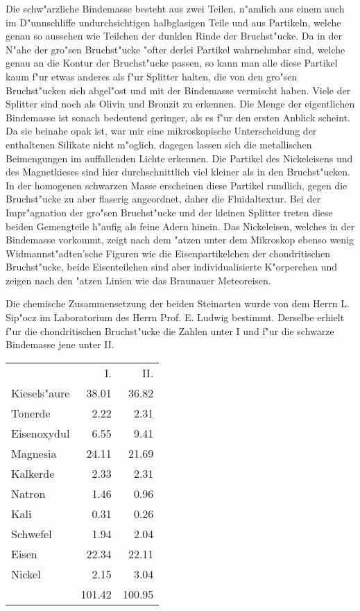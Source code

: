 \documentclass[a4paper, 11pt, oneside]{article}
\begin{document}
Die schw"arzliche Bindemasse besteht aus zwei Teilen, n"amlich aus einem auch im D"unnschliffe undurchsichtigen halbglasigen Teile und aus Partikeln, welche genau so aussehen wie Teilchen der dunklen Rinde der Bruchst"ucke. Da in der N"ahe der gro"sen Bruchst"ucke "ofter derlei Partikel wahrnehmbar sind, welche genau an die Kontur der Bruchst"ucke passen, so kann man alle diese Partikel kaum f"ur etwas anderes als f"ur Splitter halten, die von den gro"sen Bruchst"ucken sich abgel"ost und mit der Bindemasse vermischt haben. Viele der Splitter sind noch als Olivin und Bronzit zu erkennen. Die Menge der eigentlichen Bindemasse ist sonach bedeutend geringer, als es f"ur den ersten Anblick scheint. Da sie beinahe opak ist, war mir eine mikroskopische Unterscheidung der enthaltenen Silikate nicht m"oglich, dagegen lassen sich die metallischen Beimengungen im auffallenden Lichte erkennen. Die Partikel des Nickeleisens und des Magnetkieses sind hier durchschnittlich viel kleiner als in den Bruchst"ucken. In der homogenen schwarzen Masse erscheinen diese Partikel rundlich, gegen die Bruchst"ucke zu aber flaserig angeordnet, daher die Fluidaltextur. Bei der Impr"agnation der gro"sen Bruchst"ucke und der kleinen Splitter treten diese beiden Gemengteile h"aufig als feine Adern hinein. Das Nickeleisen, welches in der Bindemasse vorkommt, zeigt nach dem "atzen unter dem Mikroskop ebenso wenig Widmannst"adten'sche Figuren wie die Eisenpartikelchen der chondritischen Bruchst"ucke, beide Eisenteilehen sind aber individualisierte K"orperehen und zeigen nach den "atzen Linien wie das Braunauer Meteoreisen.

Die chemische Zusammensetzung der beiden Steinarten wurde von dem Herrn L. Sip"ocz im Laboratorium des Herrn Prof. E. Ludwig bestimmt. Derselbe erhielt f"ur die chondritischen Bruchst"ucke die Zahlen unter I und f"ur die schwarze Bindemasse jene unter II.
\begin{center}
\begin{tabular}{ l r r }
     & I. & II.\\
    Kiesels"aure & 38.01 & 36.82\\
    Tonerde & 2.22 & 2.31\\
    Eisenoxydul & 6.55 & 9.41\\
    Magnesia & 24.11 & 21.69\\
    Kalkerde & 2.33 & 2.31\\
    Natron & 1.46 & 0.96\\
    Kali & 0.31 & 0.26\\
    Schwefel & 1.94 & 2.04\\
    Eisen & 22.34 & 22.11\\
    Nickel & 2.15 & 3.04\\
     & 101.42 & 100.95\\
\end{tabular}
\end{center}
\end{document}
